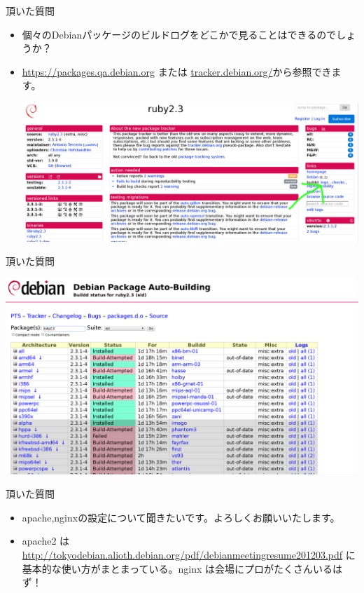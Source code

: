 \begin{frame}{頂いた質問}
\begin{itemize}[<+->]
\item 個々のDebianパッケージのビルドログをどこかで見ることはできるのでしょうか？
\item \url{https://packages.qa.debian.org} または \url{tracker.debian.org/}から参照できます。

\begin{center}
\includegraphics[width=0.8\hsize]{image201606/buildlog0.png}
\end{center}

\end{itemize}
\end{frame}

\begin{frame}{頂いた質問}

\begin{center}
\includegraphics[width=0.8\hsize]{image201606/buildlog1.png}
\end{center}

\end{frame}

\begin{frame}{頂いた質問}
\begin{itemize}[<+->]
\item apache,nginxの設定について聞きたいです。よろしくお願いいたします。
\item apache2 は \url{http://tokyodebian.alioth.debian.org/pdf/debianmeetingresume201203.pdf}
に基本的な使い方がまとまっている。nginx は会場にプロがたくさんいるはず！
\end{itemize}
\end{frame}

